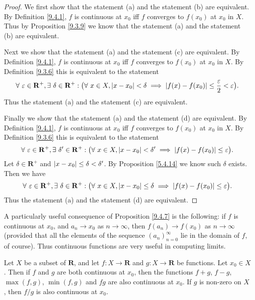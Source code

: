 \begin{proof}
    We first show that the statement (a) and the statement (b) are equivalent.
    By Definition \ref{9.4.1}, \(f\) is continuous at \(x_0\) iff \(f\) converges to \(f(x_0)\) at \(x_0\) in \(X\).
    Thus by Proposition \ref{9.3.9} we know that the statement (a) and the statement (b) are equivalent.

    Next we show that the statement (a) and the statement (c) are equivalent.
    By Definition \ref{9.4.1}, \(f\) is continuous at \(x_0\) iff \(f\) converges to \(f(x_0)\) at \(x_0\) in \(X\).
    By Definition \ref{9.3.6} this is equivalent to the statement
    \[
        \forall\ \varepsilon \in \mathbf{R}^+, \exists\ \delta \in \mathbf{R}^+ : \big(\forall\ x \in X, \abs*{x - x_0} < \delta \implies \abs*{f(x) - f(x_0)} \leq \frac{\varepsilon}{2} < \varepsilon\big).
    \]
    Thus the statement (a) and the statement (c) are equivalent.

    Finally we show that the statement (a) and the statement (d) are equivalent.
    By Definition \ref{9.4.1}, \(f\) is continuous at \(x_0\) iff \(f\) converges to \(f(x_0)\) at \(x_0\) in \(X\).
    By Definition \ref{9.3.6} this is equivalent to the statement
    \[
        \forall\ \varepsilon \in \mathbf{R}^+, \exists\ \delta' \in \mathbf{R}^+ : \big(\forall\ x \in X, \abs*{x - x_0} < \delta' \implies \abs*{f(x) - f(x_0)} \leq \varepsilon\big).
    \]
    Let \(\delta \in \mathbf{R}^+\) and \(\abs*{x - x_0} \leq \delta < \delta'\).
    By Proposition \ref{5.4.14} we know such \(\delta\) exists.
    Then we have
    \[
        \forall\ \varepsilon \in \mathbf{R}^+, \exists\ \delta \in \mathbf{R}^+ : \big(\forall\ x \in X, \abs*{x - x_0} \leq \delta \implies \abs*{f(x) - f(x_0)} \leq \varepsilon\big).
    \]
    Thus the statement (a) and the statement (d) are equivalent.
\end{proof}

\begin{remark}\label{9.4.8}
    A particularly useful consequence of Proposition \ref{9.4.7} is the following:
    if \(f\) is continuous at \(x_0\), and \(a_n \to x_0\) as \(n \to \infty\), then \(f(a_n) \to f(x_0)\) as \(n \to \infty\)
    (provided that all the elements of the sequence \((a_n)_{n = 0}^\infty\) lie in the domain of \(f\), of course).
    Thus continuous functions are very useful in computing limits.
\end{remark}

\begin{proposition}\label{9.4.9}
    Let \(X\) be a subset of \(\mathbf{R}\), and let \(f : X \to \mathbf{R}\) and \(g : X \to \mathbf{R}\) be functions.
    Let \(x_0 \in X\).
    Then if \(f\) and \(g\) are both continuous at \(x_0\), then the functions \(f + g\), \(f - g\), \(\max(f, g)\), \(\min(f, g)\) and \(fg\) are also continuous at \(x_0\).
    If \(g\) is non-zero on \(X\), then \(f / g\) is also continuous at \(x_0\).
\end{proposition}

